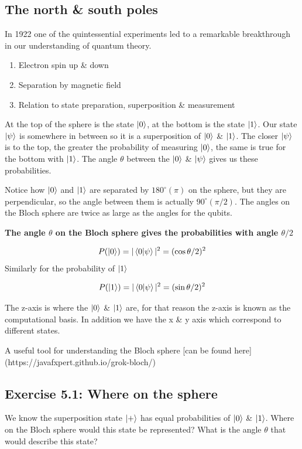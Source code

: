 \documentclass{book}
\begin{document}
\subsection{The north \& south poles}


In 1922 one of the quintessential experiments led to a remarkable breakthrough in our understanding of quantum theory. 

\begin{enumerate}
    \item Electron spin up & down
    \item Separation by magnetic field
    \item Relation to state preparation, superposition & measurement 
\end{enumerate}

At the top of the sphere  is the state $\ket{0}$, at the bottom is the state $\ket{1}$. Our state $\ket{\psi}$ is somewhere in between so it is a superposition of $\ket{0}$ & $\ket{1}$. The closer $\ket{\psi}$  is to the top, the greater the probability of measuring $\ket{0}$, the same is true for the bottom with $\ket{1}$. The angle $\theta$ between the $\ket{0}$ \& $\ket{\psi}$ gives us these probabilities. 

Notice how $\ket{0}$ and $\ket{1}$ are separated by $180^{\circ} (\pi)$ on the sphere, but they are perpendicular, so the angle between them is actually $90 ^{\circ} (\pi/2)$. The angles on the Bloch sphere are twice as large as the angles for the qubits.

\textbf{The angle $\theta$ on the Bloch sphere gives the probabilities with angle $\theta/2$}

$$
P(\ket{0}) = |\braket{0|\psi}|^2 = (\cos{\theta/2})^2
$$
Similarly for the probability of $\ket{1}$

$$P(\ket{1}) = |\braket{0|\psi}|^2 = (\sin{\theta/2})^2$$


The z-axis is where the $\ket{0}$ \& $\ket{1}$ are, for that reason the z-axis is known as the computational basis. In addition we have the x \& y axis which correspond to different states. 

A useful tool for understanding the Bloch sphere [can be found here](https://javafxpert.github.io/grok-bloch/)

\hline
\subsection{Exercise 5.1: Where on the sphere}

We know the superposition state $\ket{+}$ has equal probabilities of $\ket{0}$ \& $\ket{1}$. Where on the Bloch sphere would this state be represented? What is the angle $\theta$ that would describe this state?
\end{document}

